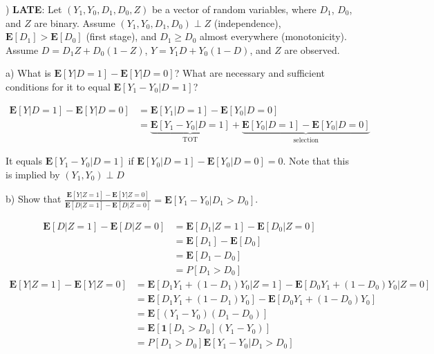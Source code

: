 \documentclass[12pt,english]{article}
\begin{document}
\vspace{1em}
) \textbf{LATE}: Let $(Y_{1}, Y_{0}, D_{1}, D_{0}, Z)$ be a vector of random variables, where $D_{1}$, $D_{0}$, and $Z$ are binary. Assume $(Y_{1}, Y_{0}, D_{1}, D_{0}) \perp Z$ (independence), $\mathbf{E}[D_{1}] > \mathbf{E}[D_{0}]$ (first stage), and $D_{1} \geq D_{0}$ almost everywhere (monotonicity). Assume $D = D_{1} Z + D_{0} (1 - Z)$, $Y = Y_{1} D + Y_{0} (1 - D)$, and $Z$ are observed.

a) What is $\mathbf{E}[Y | D = 1] - \mathbf{E}[Y | D = 0]$? What are necessary and sufficient conditions for it to equal $\mathbf{E}[Y_{1} - Y_{0} | D = 1]$?
\vspace{1em}

\begin{align*}
\mathbf{E}[Y | D = 1] - \mathbf{E}[Y | D = 0] & = \mathbf{E}[Y_{1} | D = 1] - \mathbf{E}[Y_{0} | D = 0] \\
& = \underbrace{\mathbf{E}[Y_{1} - Y_{0} | D = 1]}_{\text{TOT}} + \underbrace{\mathbf{E}[Y_{0} | D = 1] - \mathbf{E}[Y_{0} | D = 0]}_{\text{selection}}
\end{align*}

It equals $\mathbf{E}[Y_{1} - Y_{0} | D = 1]$ if $\mathbf{E}[Y_{0} | D = 1] - \mathbf{E}[Y_{0} | D = 0] = 0$. Note that this is implied by $(Y_{1}, Y_{0}) \perp D$

\vspace{1em}
b) Show that $\frac{\mathbf{E}[Y | Z = 1] - \mathbf{E}[Y | Z = 0]}{\mathbf{E}[D | Z = 1] - \mathbf{E}[D | Z = 0]} = \mathbf{E}[Y_{1} - Y_{0} | D_{1} > D_{0}]$.
\vspace{1em}

\begin{align*}
\mathbf{E}[D | Z = 1] - \mathbf{E}[D | Z = 0] & = \mathbf{E}[D_{1} | Z = 1] - \mathbf{E}[D_{0} | Z = 0] \\
& = \mathbf{E}[D_{1}] - \mathbf{E}[D_{0}] \\
& = \mathbf{E}[D_{1} - D_{0}] \\
& = P[D_{1} > D_{0}]
\end{align*}
\begin{align*}
\mathbf{E}[Y | Z = 1] - \mathbf{E}[Y | Z = 0] & = \mathbf{E}[D_{1} Y_{1} + (1 - D_{1}) Y_{0} | Z = 1] - \mathbf{E}[D_{0} Y_{1} + (1 - D_{0}) Y_{0} | Z = 0] \\
& = \mathbf{E}[D_{1} Y_{1} + (1 - D_{1}) Y_{0}] - \mathbf{E}[D_{0} Y_{1} + (1 - D_{0}) Y_{0}] \\
& = \mathbf{E}[(Y_{1} - Y_{0})(D_{1} - D_{0})] \\
& = \mathbf{E}[\mathbf{1}[D_{1} > D_{0}] (Y_{1} - Y_{0})] \\
& = P[D_{1} > D_{0}] \mathbf{E}[Y_{1} - Y_{0} | D_{1} > D_{0}]
\end{align*}
\end{document}
